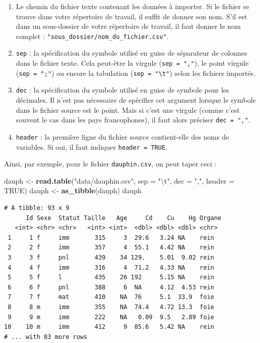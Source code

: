 \documentclass[
  a4paper,
]{article}
\newenvironment{Shaded}{\begin{snugshade}}{\end{snugshade}}
\newcommand{\CharTok}[1]{\textcolor[rgb]{0.57,0.30,0.62}{#1}}
\newcommand{\DataTypeTok}[1]{\textcolor[rgb]{0.00,0.34,0.68}{#1}}
\newcommand{\KeywordTok}[1]{\textcolor[rgb]{0.12,0.11,0.11}{\textbf{#1}}}
\newcommand{\NormalTok}[1]{\textcolor[rgb]{0.12,0.11,0.11}{#1}}
\newcommand{\OtherTok}[1]{\textcolor[rgb]{0.00,0.43,0.16}{#1}}
\newcommand{\StringTok}[1]{\textcolor[rgb]{0.75,0.01,0.01}{#1}}
\providecommand{\tightlist}{%
  \setlength{\itemsep}{0pt}\setlength{\parskip}{0pt}}
\begin{document}
\begin{enumerate}
\def\labelenumi{\arabic{enumi}.}
\tightlist
\item
  Le chemin du fichier texte contenant les données à importer. Si le fichier se trouve dans votre répertoire de travail, il suffit de donner son nom. S'il est dans un sous-dossier de votre répertoire de travail, il faut donner le nom complet : \texttt{"sous\_dossier/nom\_du\_fichier.csv"}.
\item
  \texttt{sep} : la spécification du symbole utilisé en guise de séparateur de colonnes dans le fichier texte. Cela peut-être la virgule (\texttt{sep\ =\ ","}), le point virgule (\texttt{sep\ =\ ";"}) ou encore la tabulation (\texttt{sep\ =\ "\textbackslash{}t"}) selon les fichiers importés.
\item
  \texttt{dec} : la spécification du symbole utilisé en guise de symbole pour les décimales. Il n'est pas nécessaire de spécifier cet argument lorsque le symbole dans le fichier source est le point. Mais si c'est une virgule (comme c'est souvent le cas dans les pays francophones), il faut alors préciser \texttt{dec\ =\ ","}.
\item
  \texttt{header} : la première ligne du fichier source contient-elle des noms de variables. Si oui, il faut indiquer \texttt{header\ =\ TRUE}.
\end{enumerate}

Ainsi, par exemple, pour le fichier \texttt{dauphin.csv}, on peut taper ceci :

\begin{Shaded}
\begin{Highlighting}[]
\NormalTok{dauph <-}\StringTok{ }\KeywordTok{read.table}\NormalTok{(}\StringTok{"data/dauphin.csv"}\NormalTok{, }\DataTypeTok{sep =} \StringTok{"}\CharTok{\textbackslash{}t}\StringTok{"}\NormalTok{, }\DataTypeTok{dec =} \StringTok{","}\NormalTok{, }\DataTypeTok{header =} \OtherTok{TRUE}\NormalTok{)}
\NormalTok{dauph <-}\StringTok{ }\KeywordTok{as_tibble}\NormalTok{(dauph)}
\NormalTok{dauph}
\end{Highlighting}
\end{Shaded}

\begin{verbatim}
# A tibble: 93 x 9
      Id Sexe  Statut Taille   Age     Cd    Cu    Hg Organe
   <int> <chr> <chr>   <int> <int>  <dbl> <dbl> <dbl> <chr> 
 1     1 f     imm       315     3  29.6   3.24 NA    rein  
 2     2 f     imm       357     4  55.1   4.42 NA    rein  
 3     3 f     pnl       439    34 129.    5.01  9.02 rein  
 4     4 f     imm       316     4  71.2   4.33 NA    rein  
 5     5 f     l         435    26 192     5.15 NA    rein  
 6     6 f     pnl       388     6  NA     4.12  4.53 rein  
 7     7 f     mat       410    NA  76     5.1  33.9  foie  
 8     8 m     imm       355    NA  74.4   4.72 13.3  foie  
 9     9 m     imm       222    NA   0.09  9.5   2.89 foie  
10    10 m     imm       412     9  85.6   5.42 NA    rein  
# ... with 83 more rows
\end{verbatim}
\end{document}
